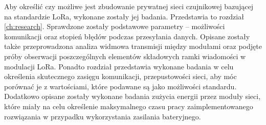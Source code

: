 Aby określić czy możliwe jest zbudowanie prywatnej sieci czujnikowej bazującej na standardzie LoRa, wykonane zostały jej
badania. Przedstawia to rozdział \ref{ch:research}. Sprawdzone zostały podstawowe parametry -- możliwości komunikacji
oraz stopień błędów podczas przesyłania danych. Opisane zostały także przeprowadzona analiza widmowa transmisji między
modułami oraz podjęte próby obserwacji poszczególnych elementów składowych ramki wiadomości w modulacji LoRa. Ponadto
rozdział przedstawia wykonane badania w celu określenia skutecznego zasięgu komunikacji, przepustowości sieci, aby móc
porównać je z wartościami, które podawane są jako możliwości standardu. Dodatkowo opisane zostały wykonane badania
zużycia energii przez moduły sieci, które miały na celu określenie maksymalnego czasu pracy zaimplementowanego
rozwiązania w przypadku wykorzystania zasilania bateryjnego.